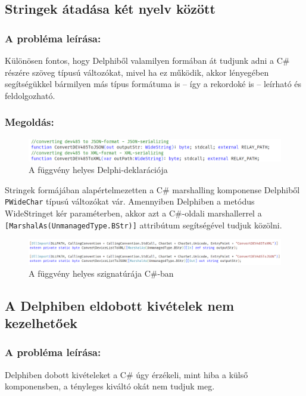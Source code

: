 \documentclass[tocnopagenum]{thesis-ekf}
\theoremstyle{definition}
\theoremstyle{remark}
\begin{document}
	\subsection{Stringek átadása két nyelv között}
	\subsubsection{A probléma leírása:} Különösen fontos, hogy Delphiből valamilyen formában át tudjunk adni a C\# részére szöveg típusú változókat, mivel ha ez működik, akkor lényegében segítségükkel bármilyen más típus formátuma is -- így a rekordoké is -- leírható és feldolgozható.
	
	\subsubsection{Megoldás:}
	\begin{figure}[h!]
		\centering
		\includegraphics[scale=0.75]{string_delphi}
		\caption{A függvény helyes Delphi-deklarációja}
		\label{string_delphi}
	\end{figure}

	Stringek formájában alapértelmezetten a C\# marshalling komponense Delphiből \verb*|PWideChar| típusú változókat vár. Amennyiben Delphiben a metódus WideStringet kér paraméterben, akkor azt a C\#-oldali marshallerrel a \verb*|[MarshalAs(UnmanagedType.BStr)]| attribútum segítségével tudjuk közölni.\cite{sof_strhandling}
	\begin{figure}[h!]
		\centering
		\includegraphics[scale=0.64]{string_csharp}
		\caption{A függvény helyes szignatúrája C\#-ban}
		\label{string_csharp}
	\end{figure}
	\subsection{A Delphiben eldobott kivételek nem kezelhetőek}
	\subsubsection{A probléma leírása:} Delphiben dobott kivételeket a C\# úgy érzékeli, mint hiba a külső komponensben, a tényleges kiváltó okát nem tudjuk meg.
\end{document}
